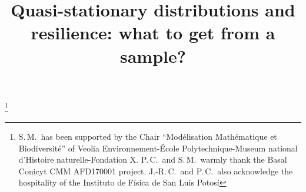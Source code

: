 \documentclass[JEP,XML,SOM,Unicode]{cedram}
\numberwithin{equation}{section}
\theoremstyle{plain}
\theoremstyle{definition}
\begin{document}
\title{Quasi-stationary distributions and resilience: what to get from a sample?}

\author[\initial{J.-R.} \lastname{Chazottes}]{ }
\address{CPHT, CNRS, École polytechnique, Institut polytechnique de Paris\\
F-91128 Palaiseau, France}

\author[\initial{P.} \lastname{Collet}]{ }
\address{CPHT, CNRS, École polytechnique, Institut polytechnique de Paris\\
F-91128 Palaiseau, France}

\author[\initial{S.} \lastname{Martínez}]{ }
\address{DIM-CMM, Universidad de Chile, UMI 2807 UChile-CNRS\\
Beauchef 851, Santiago, Chile}

\author[\initial{S.} \lastname{Méléard}]{ }
\address{CMAP, CNRS, École polytechnique, Institut polytechnique de Paris\\
F-91128 Palaiseau, France}

\thanks{S.\,M.\ has been supported by the Chair ``Modélisation Mathématique et Biodiversité'' of Veolia Environnement-École Polytechnique-Museum national d'Histoire naturelle-Fondation X. P.\,C.\ and S.\,M.\ warmly thank the Basal Conicyt CMM AFD170001 project. J.-R.\,C.\ and P.\,C.\ also acknowledge the hospitality of the Instituto de Física de San Luis Potosí}
\end{document}
